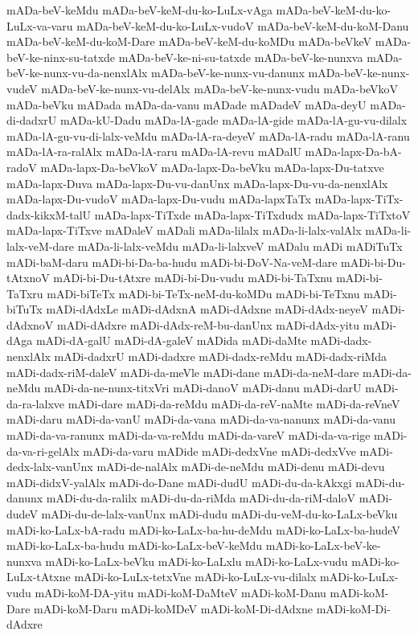 {mADa-beV-keMdu
mADa-beV-keM-du-ko-LuLx-vAga
mADa-beV-keM-du-ko-LuLx-va-varu
mADa-beV-keM-du-ko-LuLx-vudoV
mADa-beV-keM-du-koM-Danu
mADa-beV-keM-du-koM-Dare
mADa-beV-keM-du-koMDu
mADa-beVkeV
mADa-beV-ke-ninx-su-tatxde
mADa-beV-ke-ni-su-tatxde
mADa-beV-ke-nunxva
mADa-beV-ke-nunx-vu-da-nenxlAlx
mADa-beV-ke-nunx-vu-danunx
mADa-beV-ke-nunx-vudeV
mADa-beV-ke-nunx-vu-delAlx
mADa-beV-ke-nunx-vudu
mADa-beVkoV
mADa-beVku
mADada
mADa-da-vanu
mADade
mADadeV
mADa-deyU
mADa-di-dadxrU
mADa-kU-Dadu
mADa-lA-gade
mADa-lA-gide
mADa-lA-gu-vu-dilalx
mADa-lA-gu-vu-di-lalx-veMdu
mADa-lA-ra-deyeV
mADa-lA-radu
mADa-lA-ranu
mADa-lA-ra-ralAlx
mADa-lA-raru
mADa-lA-revu
mADalU
mADa-lapx-Da-bA-radoV
mADa-lapx-Da-beVkoV
mADa-lapx-Da-beVku
mADa-lapx-Du-tatxve
mADa-lapx-Duva
mADa-lapx-Du-vu-danUnx
mADa-lapx-Du-vu-da-nenxlAlx
mADa-lapx-Du-vudoV
mADa-lapx-Du-vudu
mADa-lapxTaTx
mADa-lapx-TiTx-dadx-kikxM-talU
mADa-lapx-TiTxde
mADa-lapx-TiTxdudx
mADa-lapx-TiTxtoV
mADa-lapx-TiTxve
mADaleV
mADali
mADa-lilalx
mADa-li-lalx-valAlx
mADa-li-lalx-veM-dare
mADa-li-lalx-veMdu
mADa-li-lalxveV
mADalu
mADi
mADiTuTx
mADi-baM-daru
mADi-bi-Da-ba-hudu
mADi-bi-DoV-Na-veM-dare
mADi-bi-Du-tAtxnoV
mADi-bi-Du-tAtxre
mADi-bi-Du-vudu
mADi-bi-TaTxnu
mADi-bi-TaTxru
mADi-biTeTx
mADi-bi-TeTx-neM-du-koMDu
mADi-bi-TeTxnu
mADi-biTuTx
mADi-dAdxLe
mADi-dAdxnA
mADi-dAdxne
mADi-dAdx-neyeV
mADi-dAdxnoV
mADi-dAdxre
mADi-dAdx-reM-bu-danUnx
mADi-dAdx-yitu
mADi-dAga
mADi-dA-galU
mADi-dA-galeV
mADida
mADi-daMte
mADi-dadx-nenxlAlx
mADi-dadxrU
mADi-dadxre
mADi-dadx-reMdu
mADi-dadx-riMda
mADi-dadx-riM-daleV
mADi-da-meVle
mADi-dane
mADi-da-neM-dare
mADi-da-neMdu
mADi-da-ne-nunx-titxVri
mADi-danoV
mADi-danu
mADi-darU
mADi-da-ra-lalxve
mADi-dare
mADi-da-reMdu
mADi-da-reV-naMte
mADi-da-reVneV
mADi-daru
mADi-da-vanU
mADi-da-vana
mADi-da-va-nanunx
mADi-da-vanu
mADi-da-va-ranunx
mADi-da-va-reMdu
mADi-da-vareV
mADi-da-va-rige
mADi-da-va-ri-gelAlx
mADi-da-varu
mADide
mADi-dedxVne
mADi-dedxVve
mADi-dedx-lalx-vanUnx
mADi-de-nalAlx
mADi-de-neMdu
mADi-denu
mADi-devu
mADi-didxV-yalAlx
mADi-do-Dane
mADi-dudU
mADi-du-da-kAkxgi
mADi-du-danunx
mADi-du-da-ralilx
mADi-du-da-riMda
mADi-du-da-riM-daloV
mADi-dudeV
mADi-du-de-lalx-vanUnx
mADi-dudu
mADi-du-veM-du-ko-LaLx-beVku
mADi-ko-LaLx-bA-radu
mADi-ko-LaLx-ba-hu-deMdu
mADi-ko-LaLx-ba-hudeV
mADi-ko-LaLx-ba-hudu
mADi-ko-LaLx-beV-keMdu
mADi-ko-LaLx-beV-ke-nunxva
mADi-ko-LaLx-beVku
mADi-ko-LaLxlu
mADi-ko-LaLx-vudu
mADi-ko-LuLx-tAtxne
mADi-ko-LuLx-tetxVne
mADi-ko-LuLx-vu-dilalx
mADi-ko-LuLx-vudu
mADi-koM-DA-yitu
mADi-koM-DaMteV
mADi-koM-Danu
mADi-koM-Dare
mADi-koM-Daru
mADi-koMDeV
mADi-koM-Di-dAdxne
mADi-koM-Di-dAdxre
}
